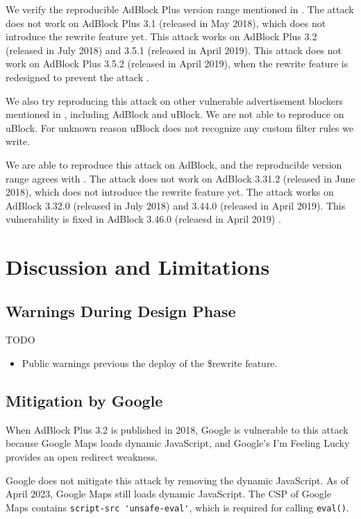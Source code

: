 \documentclass[conference]{IEEEtran}
\begin{document}
We verify the reproducible AdBlock Plus version range mentioned in \cite{abp_code_injection}. The attack does not work on AdBlock Plus 3.1 (released in May 2018), which does not introduce the rewrite feature yet. This attack works on AdBlock Plus 3.2 (released in July 2018) and 3.5.1 (released in April 2019). This attack does not work on AdBlock Plus 3.5.2 (released in April 2019), when the rewrite feature is redesigned to prevent the attack \cite{cr4chrome_abp}.

We also try reproducing this attack on other vulnerable advertisement blockers mentioned in \cite{abp_code_injection}, including AdBlock and uBlock. We are not able to reproduce on uBlock. For unknown reason uBlock does not recognize any custom filter rules we write.

We are able to reproduce this attack on AdBlock, and the reproducible version range agrees with \cite{abp_code_injection}. The attack does not work on AdBlock 3.31.2 (released in June 2018), which does not introduce the rewrite feature yet. The attack works on AdBlock 3.32.0 (released in July 2018) and 3.44.0 (released in April 2019). This vulnerability is fixed in AdBlock 3.46.0 (releaesd in April 2019) \cite{cr4chrome_ab}.

\section{Discussion and Limitations}

\subsection{Warnings During Design Phase}

TODO

\begin{itemize}
\item Public warnings previous the deploy of the \$rewrite feature.
\end{itemize}

\subsection{Mitigation by Google}
\label{subsec:google_mitigate}

When AdBlock Plus 3.2 is published in 2018, Google is vulnerable to this attack because Google Maps loads dynamic JavaScript, and Google's I'm Feeling Lucky provides an open redirect weakness.

Google does not mitigate this attack by removing the dynamic JavaScript. As of April 2023, Google Maps still loads dynamic JavaScript. The CSP of Google Maps contains \lstinline{script-src 'unsafe-eval'}, which is required for calling \lstinline{eval()}.
\end{document}
